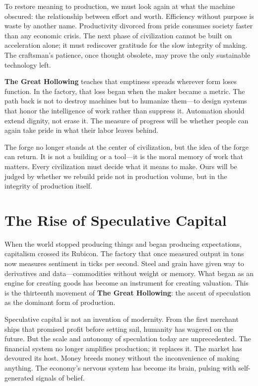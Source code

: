 \documentclass[11pt,twoside]{book}
\begin{document}
To restore meaning to production, we must look again at what the machine obscured: the relationship between effort and worth.  Efficiency without purpose is waste by another name.  Productivity divorced from pride consumes society faster than any economic crisis.  The next phase of civilization cannot be built on acceleration alone; it must rediscover gratitude for the slow integrity of making.  The craftsman’s patience, once thought obsolete, may prove the only sustainable technology left.

\textbf{The Great Hollowing} teaches that emptiness spreads wherever form loses function.  In the factory, that loss began when the maker became a metric.  The path back is not to destroy machines but to humanize them—to design systems that honor the intelligence of work rather than suppress it.  Automation should extend dignity, not erase it.  The measure of progress will be whether people can again take pride in what their labor leaves behind.

The forge no longer stands at the center of civilization, but the idea of the forge can return.  It is not a building or a tool—it is the moral memory of work that matters.  Every civilization must decide what it means to make.  Ours will be judged by whether we rebuild pride not in production volume, but in the integrity of production itself.

\chapter{The Rise of Speculative Capital}
\label{ch:13}

When the world stopped producing things and began producing expectations, capitalism crossed its Rubicon.  
The factory that once measured output in tons now measures sentiment in ticks per second.  Steel and grain have given way to derivatives and data—commodities without weight or memory.  What began as an engine for creating goods has become an instrument for creating valuation.  This is the thirteenth movement of \textbf{The Great Hollowing}: the ascent of speculation as the dominant form of production.

Speculative capital is not an invention of modernity.  From the first merchant ships that promised profit before setting sail, humanity has wagered on the future.  But the scale and autonomy of speculation today are unprecedented.  The financial system no longer amplifies production; it replaces it.  The market has devoured its host.  Money breeds money without the inconvenience of making anything.  The economy’s nervous system has become its brain, pulsing with self-generated signals of belief.
\end{document}
